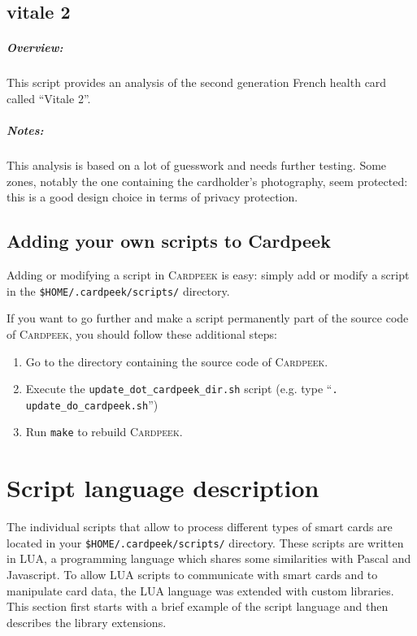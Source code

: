 \documentclass[11pt]{report}
\newcommand{\Cardpeek}{\textsc{Cardpeek}}
\begin{document}
\section{vitale 2}

\paragraph{Overview:}
This script provides an analysis of the second generation French health card called ``Vitale 2''.

\paragraph{Notes:}
This analysis is based on a lot of guesswork and needs further testing.
Some zones, notably the one containing the cardholder's photography, seem protected: this is a good design choice in terms of privacy protection.

\section{Adding your own scripts to Cardpeek}
Adding or modifying a script in \Cardpeek{} is easy: simply add or modify a script in the \texttt{\$HOME/.cardpeek/scripts/} directory.

If you want to go further and make a script permanently part of the source code of \Cardpeek, you should follow these additional steps:
\begin{enumerate}
\item{Go to the directory containing the source code of \Cardpeek.}
\item{Execute the \texttt{update\_dot\_cardpeek\_dir.sh} script (e.g. type ``\texttt{. update\_do\_cardpeek.sh}'')}
\item{Run \texttt{make} to rebuild \Cardpeek.}
\end{enumerate}

\chapter{Script language description}

The individual scripts that allow to process different types of smart cards are located in your 
\texttt{\$HOME/.cardpeek/scripts/} directory.
These scripts are written in LUA, a programming language which shares some similarities with Pascal and Javascript.
To allow LUA scripts to communicate with smart cards and to manipulate card data, the LUA language was extended with custom libraries.
This section first starts with a brief example of the script language and then describes the library extensions.
\end{document}
